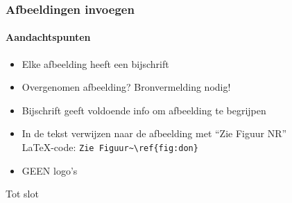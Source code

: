 \begin{frame}[fragile]
  \frametitle{Afbeeldingen invoegen}
  \framesubtitle{Aandachtspunten}
  
  \begin{itemize}
    \item Elke afbeelding heeft een bijschrift
    \item Overgenomen afbeelding? Bronvermelding nodig!
    \item Bijschrift geeft voldoende info om afbeelding te begrijpen
    \item In de tekst verwijzen naar de afbeelding met ``Zie Figuur NR''\\
    \LaTeX{}-code: \verb|Zie Figuur~\ref{fig:don}|
    \item GEEN logo's
  \end{itemize}

\end{frame}

\begin{frame}{Tot slot}


\end{frame}